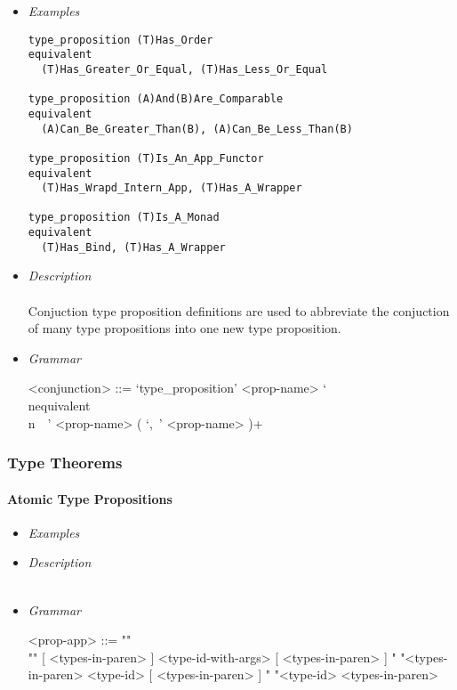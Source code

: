 \documentclass{article}
\begin{document}
\begin{itemize}
\item \textit{Examples}
\begin{verbatim}
type_proposition (T)Has_Order
equivalent
  (T)Has_Greater_Or_Equal, (T)Has_Less_Or_Equal

type_proposition (A)And(B)Are_Comparable
equivalent
  (A)Can_Be_Greater_Than(B), (A)Can_Be_Less_Than(B)

type_proposition (T)Is_An_App_Functor
equivalent
  (T)Has_Wrapd_Intern_App, (T)Has_A_Wrapper

type_proposition (T)Is_A_Monad
equivalent
  (T)Has_Bind, (T)Has_A_Wrapper
\end{verbatim}

\item \textit{Description}\\\\
Conjuction type proposition definitions are used to abbreviate the conjuction
of many type propositions into one new type proposition.

\item \textit{Grammar}
\begin{grammar}
<conjunction> ::= 
`type_proposition' <prop-name>
`\\nequivalent\\n\ \ ' <prop-name> ( `,\ ' <prop-name> )+
\end{grammar} 
\end{itemize}

\subsubsection{Type Theorems}
\label{subsubsec:ttheo}

\paragraph{Atomic Type Propositions}

\begin{itemize}
\item \textit{Examples}
\item \textit{Description} \\\\
\item \textit{Grammar}
\begin{grammar}
<prop-app> ::= ""\\""
[ <types-in-paren> ] <type-id-with-args> [ <types-in-paren> ]
\alt " "<types-in-paren> <type-id> [ <types-in-paren> ]
\alt " "<type-id> <types-in-paren>
\end{grammar} 
\end{itemize}
\end{document}
